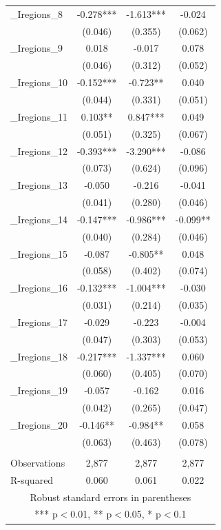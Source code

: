 \documentclass[]{article}
\begin{document}
\begin{tabular}{lccc}
\_Iregions\_8 & -0.278*** & -1.613*** & -0.024 \\
 & (0.046) & (0.355) & (0.062) \\
\_Iregions\_9 & 0.018 & -0.017 & 0.078 \\
 & (0.046) & (0.312) & (0.052) \\
\_Iregions\_10 & -0.152*** & -0.723** & 0.040 \\
 & (0.044) & (0.331) & (0.051) \\
\_Iregions\_11 & 0.103** & 0.847*** & 0.049 \\
 & (0.051) & (0.325) & (0.067) \\
\_Iregions\_12 & -0.393*** & -3.290*** & -0.086 \\
 & (0.073) & (0.624) & (0.096) \\
\_Iregions\_13 & -0.050 & -0.216 & -0.041 \\
 & (0.041) & (0.280) & (0.046) \\
\_Iregions\_14 & -0.147*** & -0.986*** & -0.099** \\
 & (0.040) & (0.284) & (0.046) \\
\_Iregions\_15 & -0.087 & -0.805** & 0.048 \\
 & (0.058) & (0.402) & (0.074) \\
\_Iregions\_16 & -0.132*** & -1.004*** & -0.030 \\
 & (0.031) & (0.214) & (0.035) \\
\_Iregions\_17 & -0.029 & -0.223 & -0.004 \\
 & (0.047) & (0.303) & (0.053) \\
\_Iregions\_18 & -0.217*** & -1.337*** & 0.060 \\
 & (0.060) & (0.405) & (0.070) \\
\_Iregions\_19 & -0.057 & -0.162 & 0.016 \\
 & (0.042) & (0.265) & (0.047) \\
\_Iregions\_20 & -0.146** & -0.984** & 0.058 \\
 & (0.063) & (0.463) & (0.078) \\
 &  &  &  \\
Observations & 2,877 & 2,877 & 2,877 \\
 R-squared & 0.060 & 0.061 & 0.022 \\ \hline
\multicolumn{4}{c}{ Robust standard errors in parentheses} \\
\multicolumn{4}{c}{ *** p$<$0.01, ** p$<$0.05, * p$<$0.1} \\
\end{tabular}
\end{document}
